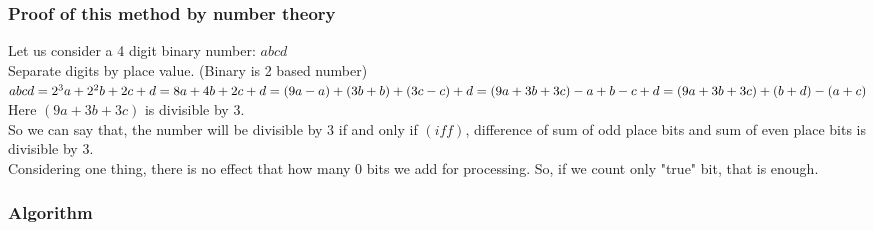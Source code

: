 \documentclass[11 pt]{article}
\begin{document}
\subsubsection{Proof of this method by number theory}
Let us consider a 4 digit binary number: $abcd$\\
Separate digits by place value. (Binary is 2 based number)\\
$
abcd = 2^3a+2^2b+2c+d\\
= 8a+4b+2c+d\\
= (9a-a)+(3b+b)+(3c-c)+d\\
= (9a+3b+3c)-a+b-c+d\\
= (9a+3b+3c)+{(b+d)-(a+c)}\\
$
Here $(9a+3b+3c)$ is divisible by $3$.
\\
So we can say that, the number will be divisible by $3$ if and only if $(iff)$, difference of sum of odd place bits and sum of even place bits is divisible by $3$.
\\
Considering one thing, there is no effect that how many $0$ bits we add for processing. So, if we count only "true" bit, that is enough.

\subsubsection{Algorithm}
\end{document}
